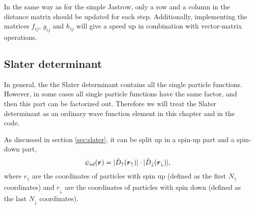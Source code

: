 In the same way as for the simple Jastrow, only a row and a column in the distance matrix should be updated for each step. Additionally, implementing the matrices $f_{ij}$, $g_{ij}$ and $h_{ij}$ will give a speed up in combination with vector-matrix operations. 

\subsection{Slater determinant} \label{sec:slaterdeterminant}
In general, the the Slater determinant contains all the single particle functions. However, in some cases all single particle functions have the same factor, and then this part can be factorized out. Therefore we will treat the Slater determinant as an ordinary wave function element in this chapter and in the code. 

As discussed in section \eqref{sec:slater}, it can be split up in a spin-up part and a spin-down part,
\begin{equation}
\psi_{sd}(\boldsymbol{{r}})=
|\hat{D}_{\uparrow}(\boldsymbol{{r}}_{\uparrow})|\cdot |\hat{D}_{\downarrow}(\boldsymbol{{r}}_{\downarrow})|,
\end{equation}
where $r_{\uparrow}$ are the coordinates of particles with spin up (defined as the first $N_{\uparrow}$ coordinates) and $r_{\downarrow}$ are the coordinates of particles with spin down (defined as the last $N_{\downarrow}$ coordinates). 

